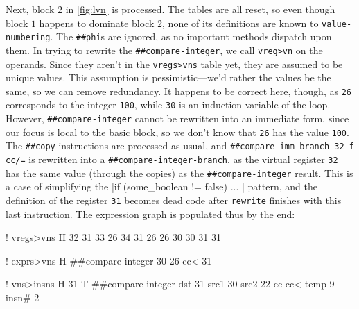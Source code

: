 Next, block $2$ in \vref{fig:lvn} is processed.  The tables are all reset, so
even though block $1$ happens to dominate block $2$, none of its definitions
are known to \Verb|value-numbering|.  The \Verb|##phi|s are ignored, as no
important methods dispatch upon them.  In trying to rewrite the
\Verb|##compare-integer|, we call \Verb|vreg>vn| on the operands.  Since they
aren't in the \Verb|vregs>vns| table yet, they are assumed to be unique values.
This assumption is pessimistic---we'd rather the values be the same, so we can
remove redundancy.  It happens to be correct here, though, as \Verb|26|
corresponds to the integer \Verb|100|, while \Verb|30| is an induction variable
of the loop.  However, \Verb|##compare-integer| cannot be rewritten into an
immediate form, since our focus is local to the basic block, so we don't know
that \Verb|26| has the value \Verb|100|.  The \Verb|##copy| instructions are
processed as usual, and
%
\Verb|##compare-imm-branch 32 f cc/=|
%
is rewritten into a \Verb|##compare-integer-branch|, as the virtual register
\Verb|32| has the same value (through the copies) as the
\Verb|##compare-integer| result.  This is a case of simplifying the 
%
|if (some_boolean != false) { ... }|
%
pattern, and the definition of the register \Verb|31| becomes dead code after
\Verb|rewrite| finishes with this last instruction.  The expression graph is
populated thus by the end:
%
  \begin{factorcode}
    ! vregs>vns
    H{
        { 32 31 }
        { 33 26 }
        { 34 31 }
        { 26 26 }
        { 30 30 }
        { 31 31 }
    }

    ! exprs>vns
    H{ { { ##compare-integer 30 26 cc< } 31 } }

    ! vns>insns
    H{
        {
            31
            T{ ##compare-integer
                { dst 31 }
                { src1 30 }
                { src2 22 }
                { cc cc< }
                { temp 9 }
                { insn# 2 }
            }
        }
    }
  \end{factorcode}

